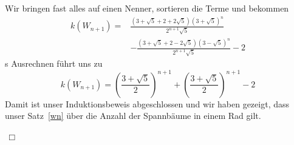 Wir bringen fast alles auf einen Nenner, sortieren die Terme und bekommen
\begin{equation*}
\begin{aligned}
\mathit{k}\left(W_{n+1}\right) = {}  & \frac{\left(3+\sqrt{5}+2+2\sqrt{5}\right)\left(3+\sqrt{5}\right)^{n}}{2^{n+1}\sqrt{5}} \\%
                        & -\frac{\left(3+\sqrt{5}+2-2\sqrt{5}\right)\left(3-\sqrt{5}\right)^{n}}{2^{n+1}\sqrt{5}}-2 
\end{aligned}
\end{equation*}s
Ausrechnen führt uns zu\\
\begin{equation*}
\mathit{k}\left(W_{n+1}\right) = \left(\frac{3+\sqrt{5}}{2}\right)^{n+1}+\left(\frac{3+\sqrt{5}}{2}\right)^{n+1}-2
\end{equation*}
Damit ist unser Induktionsbeweis abgeschlossen und wir haben gezeigt, dass unser Satz~\ref{wn} über die Anzahl der Spannbäume in einem Rad gilt.
\begin{flushright} $\,\Box\,$ \end{flushright} 
